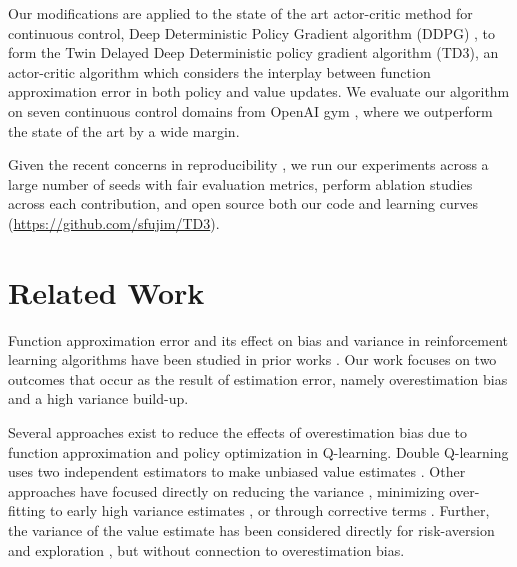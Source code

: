 \documentclass{article}
\begin{document}
Our modifications are applied to the state of the art actor-critic method for continuous control, Deep Deterministic Policy Gradient algorithm (DDPG) \cite{DDPG}, to form the Twin Delayed Deep Deterministic policy gradient algorithm (TD3), an actor-critic algorithm which considers the interplay between function approximation error in both policy and value updates. We evaluate our algorithm on seven continuous control domains from OpenAI gym \cite{OpenAIGym}, where we outperform the state of the art by a wide margin.

Given the recent concerns in reproducibility \cite{hendersonRL2017}, we run our experiments across a large number of seeds with fair evaluation metrics, perform ablation studies across each contribution, and open source both our code and learning curves (\url{https://github.com/sfujim/TD3}). 

\section{Related Work}


Function approximation error and its effect on bias and variance in reinforcement learning algorithms have been studied in prior works \cite{pendrith1997estimator, mannor2007bias}. Our work focuses on two outcomes that occur as the result of estimation error, namely overestimation bias and a high variance build-up.  

Several approaches exist to reduce the effects of overestimation bias due to function approximation and policy optimization in Q-learning. Double Q-learning uses two independent estimators to make unbiased value estimates \cite{hasselt2010double, DoubleDQN}. Other approaches have focused directly on reducing the variance \cite{AVGDQN}, minimizing over-fitting to early high variance estimates \cite{fox2015glearning}, or through corrective terms \cite{lee2013biascor}. Further, the variance of the value estimate has been considered directly for risk-aversion \cite{mannor2011mean} and exploration \cite{UncertaintyBellman}, but without connection to overestimation bias. 
\end{document}

